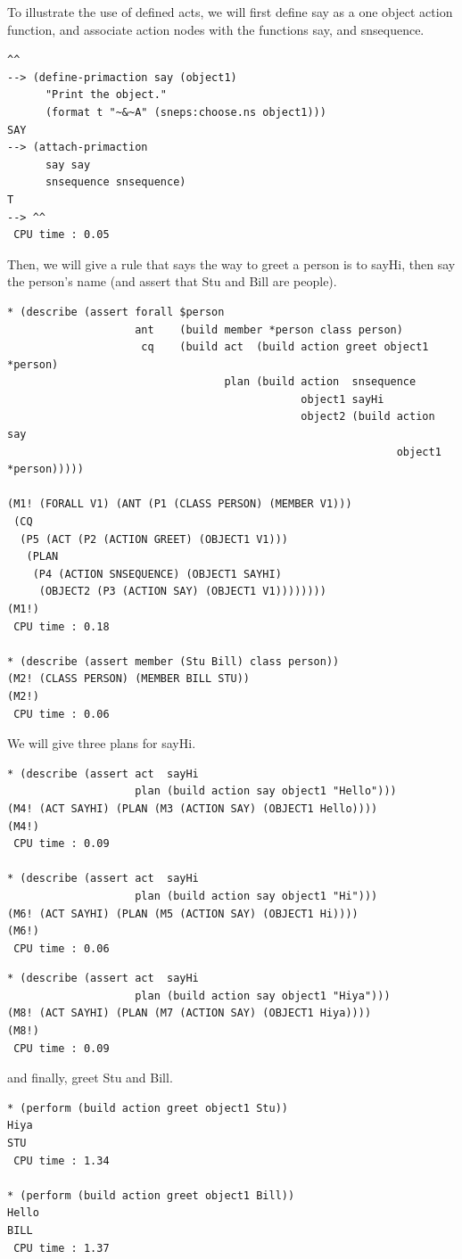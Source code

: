 \documentclass{book}
\newcommand{\ct}[1]{{\ttfamily #1}} %
\begin{document}
\pagebreak
To illustrate the use of defined acts, we will first define \ct{say}
as a one object action function, and associate action nodes with the
functions \ct{say}, and \ct{snsequence}.
\begin{verbatim}
^^
--> (define-primaction say (object1)
      "Print the object."
      (format t "~&~A" (sneps:choose.ns object1)))
SAY
--> (attach-primaction
      say say
      snsequence snsequence)
T
--> ^^
 CPU time : 0.05 
\end{verbatim}
Then, we will give a rule that says the way to greet a person is to
\ct{sayHi}, then say the person's name (and assert that Stu and Bill
are people).
\begin{verbatim}
* (describe (assert forall $person
                    ant    (build member *person class person)
                     cq    (build act  (build action greet object1 *person)
                                  plan (build action  snsequence
                                              object1 sayHi
                                              object2 (build action  say
                                                             object1 *person)))))

(M1! (FORALL V1) (ANT (P1 (CLASS PERSON) (MEMBER V1)))
 (CQ
  (P5 (ACT (P2 (ACTION GREET) (OBJECT1 V1)))
   (PLAN
    (P4 (ACTION SNSEQUENCE) (OBJECT1 SAYHI)
     (OBJECT2 (P3 (ACTION SAY) (OBJECT1 V1))))))))
(M1!)
 CPU time : 0.18 

* (describe (assert member (Stu Bill) class person))
(M2! (CLASS PERSON) (MEMBER BILL STU))
(M2!)
 CPU time : 0.06 

\end{verbatim}
We will give three plans for \ct{sayHi}.
\begin{verbatim}
* (describe (assert act  sayHi
                    plan (build action say object1 "Hello")))
(M4! (ACT SAYHI) (PLAN (M3 (ACTION SAY) (OBJECT1 Hello))))
(M4!)
 CPU time : 0.09 

* (describe (assert act  sayHi
                    plan (build action say object1 "Hi")))
(M6! (ACT SAYHI) (PLAN (M5 (ACTION SAY) (OBJECT1 Hi))))
(M6!)
 CPU time : 0.06 
\end{verbatim}
\pagebreak
\begin{verbatim}
* (describe (assert act  sayHi
                    plan (build action say object1 "Hiya")))
(M8! (ACT SAYHI) (PLAN (M7 (ACTION SAY) (OBJECT1 Hiya))))
(M8!)
 CPU time : 0.09 
\end{verbatim}
and finally, \ct{greet} Stu and Bill.
\begin{verbatim}
* (perform (build action greet object1 Stu))
Hiya
STU
 CPU time : 1.34 

* (perform (build action greet object1 Bill))
Hello
BILL
 CPU time : 1.37 
\end{verbatim}
\end{document}
